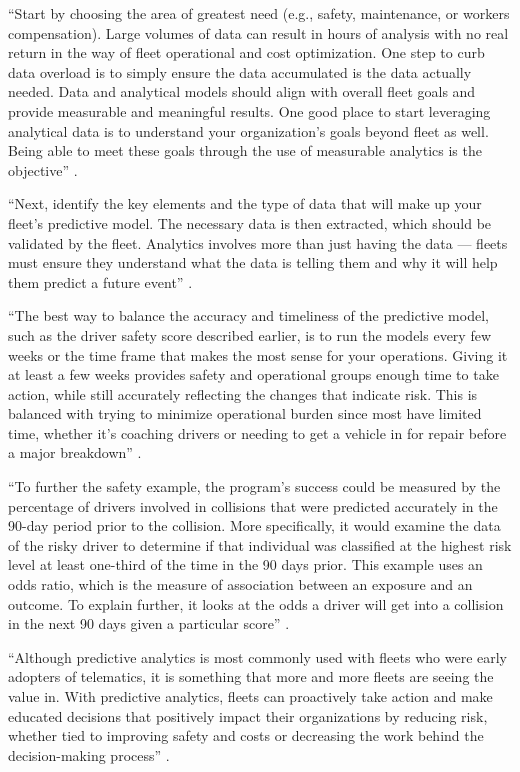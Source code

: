 ``Start by choosing the area of greatest need (e.g., safety, maintenance, or workers compensation). Large volumes of data can result in hours of analysis with no real return in the way of fleet operational and cost optimization. One step to curb data overload is to simply ensure the data accumulated is the data actually needed. Data and analytical models should align with overall fleet goals and provide measurable and meaningful results. One good place to start leveraging analytical data is to understand your organization’s goals beyond fleet as well. Being able to meet these goals through the use of measurable analytics is the objective'' \cite{Suizo2015decisions}.

``Next, identify the key elements and the type of data that will make up your fleet’s predictive model. The necessary data is then extracted, which should be validated by the fleet. Analytics involves more than just having the data — fleets must ensure they understand what the data is telling them and why it will help them predict a future event'' \cite{Suizo2015decisions}.

``The best way to balance the accuracy and timeliness of the predictive model, such as the driver safety score described earlier, is to run the models every few weeks or the time frame that makes the most sense for your operations. Giving it at least a few weeks provides safety and operational groups enough time to take action, while still accurately reflecting the changes that indicate risk. This is balanced with trying to minimize operational burden since most have limited time, whether it’s coaching drivers or needing to get a vehicle in for repair before a major breakdown'' \cite{Suizo2015decisions}.

``To further the safety example, the program’s success could be measured by the percentage of drivers involved in collisions that were predicted accurately in the 90-day period prior to the collision. More specifically, it would examine the data of the risky driver to determine if that individual was classified at the highest risk level at least one-third of the time in the 90 days prior. This example uses an odds ratio, which is the measure of association between an exposure and an outcome. To explain further, it looks at the odds a driver will get into a collision in the next 90 days given a particular score'' \cite{Suizo2015decisions}.

``Although predictive analytics is most commonly used with fleets who were early adopters of telematics, it is something that more and more fleets are seeing the value in. With predictive analytics, fleets can proactively take action and make educated decisions that positively impact their organizations by reducing risk, whether tied to improving safety and costs or decreasing the work behind the decision-making process'' \cite{Suizo2015decisions}.

